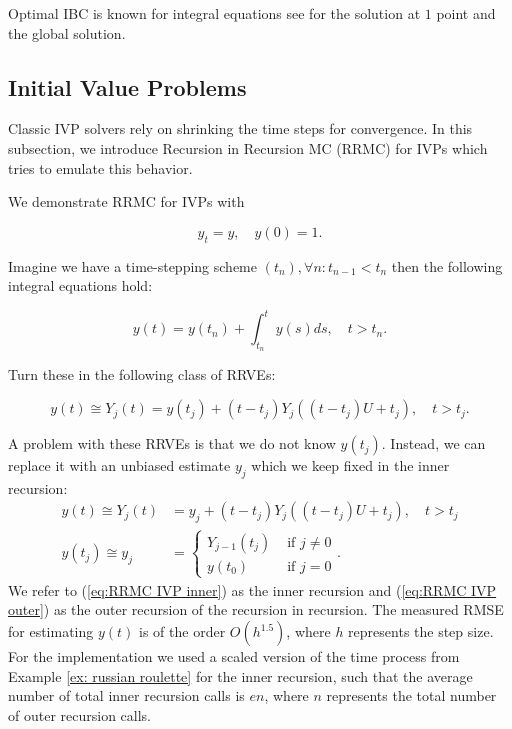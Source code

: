 \documentclass[a4paper,12pt]{article}
\begin{document}
\begin{related}
  Optimal IBC is known for integral equations see \cite{heinrich_monte_1998}
  for the solution at $1$ point and the global solution.
\end{related}

\subsection{Initial Value Problems}
Classic IVP solvers rely on shrinking the time steps for
convergence. In this subsection, we introduce
Recursion in Recursion MC (RRMC) for IVPs which tries to emulate
this behavior.


\begin{example}[RRMC $y_t=y$] \label{ex:RRMC IVP}
  We demonstrate RRMC for IVPs with

  \begin{equation}
    y_t = y, \quad y(0) = 1.
  \end{equation}

  Imagine we have a time-stepping scheme $(t_{n}), \forall n: t_{n-1} < t_{n}$
  then the following integral equations hold:

  \begin{equation}
    y(t)= y(t_{n}) + \int_{t_{n}}^{t}y(s)ds , \quad t>t_{n}.
  \end{equation}

  Turn these in the following class of RRVEs:

  \begin{equation}
    y(t) \cong Y_{j}(t) = y(t_{j}) + (t-t_{j})Y_{j}((t-t_{j})U+t_{j}), \quad t>t_{j}.
  \end{equation}

  A problem with these RRVEs is that we do not know $y(t_{j})$.
  Instead, we can replace it with an unbiased estimate $y_{j}$
  which we keep fixed in the inner recursion:
  \begin{align}
    \label{eq:RRMC IVP inner}
    y(t) \cong Y_{j}(t)  & = y_{j} + (t-t_{j})Y_{j}((t-t_{j})U+t_{j}), \quad t>t_{j} \\
    y(t_{j}) \cong y_{j} & = \begin{cases}
                               Y_{j-1}(t_{j}) & \text{ if } j \neq 0 \\
                               y(t_{0})       & \text{ if } j = 0
                             \end{cases}.
    \label{eq:RRMC IVP outer}
  \end{align}
  We refer to (\ref{eq:RRMC IVP inner}) as the inner recursion and
  (\ref{eq:RRMC IVP outer}) as the outer recursion of the recursion in
  recursion.
  The measured RMSE for estimating $y(t)$ is of the order
  $O\left(h^{1.5} \right)$, where $h$ represents
  the step size. For the implementation we used a scaled version
  of the time process from Example \ref{ex: russian roulette}
  for the inner recursion, such that the average number of total inner recursion calls
  is $e n$, where $n$ represents the total number of outer recursion calls.
\end{example}
\end{document}
